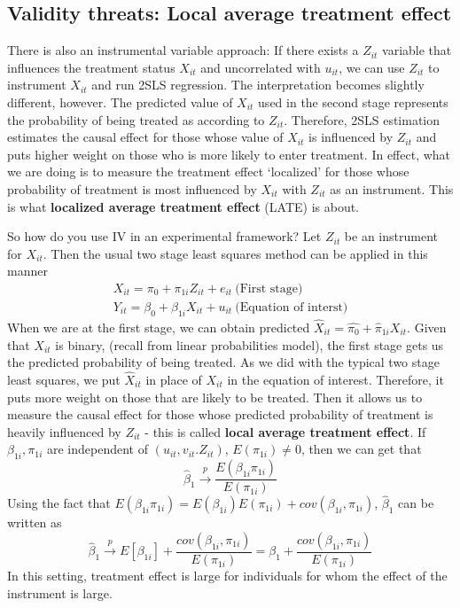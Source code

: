 \documentclass[12pt]{article}
\theoremstyle{definition}
\theoremstyle{property}
\theoremstyle{assumption}
\theoremstyle{example}
\theoremstyle{comment}
\begin{document}
\subsection{Validity threats: Local average treatment effect}
There is also an instrumental variable approach: If there exists a $Z_{it}$ variable that influences the treatment status $X_{it}$ and uncorrelated with $u_{it}$, we can use $Z_{it}$ to instrument $X_{it}$ and run 2SLS regression. The interpretation becomes slightly different, however. The predicted value of $X_{it}$ used in the second stage represents the probability of being treated as according to $Z_{it}$. Therefore, 2SLS estimation estimates the causal effect for those whose value of $X_{it}$ is influenced by $Z_{it}$ and puts higher weight on those who is more likely to enter treatment. In effect, what we are doing is to measure the treatment effect `localized' for those whose probability of treatment is most influenced by $X_{it}$ with $Z_{it}$ as an instrument. This is what \textbf{localized average treatment effect} (LATE) is about.
\par\medskip
So how do you use IV in an experimental framework? Let $Z_{it}$ be an instrument for $X_{it}$. Then the usual two stage least squares method can be applied in this manner
\begin{gather*}
X_{it} = \pi_0+\pi_{1i}Z_{it}+e_{it} \ \text{(First stage)}\\
Y_{it} = \beta_0+\beta_{1i}X_{it}+u_{it} \ \text{(Equation of interst)}
\end{gather*}
When we are at the first stage, we can obtain predicted $\hat{X}_{it}=\hat{\pi_0}+\hat{\pi}_{1i}X_{it}$. Given that $X_{it}$ is binary, (recall from linear probabilities model), the first stage gets us the predicted probability of being treated. As we did with the typical two stage least squares, we put $\hat{X}_{it}$ in place of $X_{it}$ in the equation of interest. Therefore, it puts more weight on those that are likely to be treated. Then it allows us to measure the causal effect for those whose predicted probability of treatment is heavily influenced by $Z_{it}$ - this is called \textbf{local average treatment effect}. If $\beta_{1i}, \pi_{1i}$ are independent of $(u_{it},v_{it}.Z_{it})$, $E(\pi_{1i})\neq0$, then we can get that
\[
\hat{\beta}_{1}\xrightarrow{p}\frac{E(\beta_{1i}\pi_{1i})}{E(\pi_{1i})}
\]
Using the fact that $E(\beta_{1i}\pi_{1i})=E(\beta_{1i})E(\pi_{1i})+cov(\beta_{1i},\pi_{1i})$, $\hat{\beta}_1$ can be written as 
\[
\hat{\beta}_{1}\xrightarrow{p} E[\beta_{1i}]+\frac{cov(\beta_{1i},\pi_{1i})}{E(\pi_{1i})} = \beta_1+\frac{cov(\beta_{1i},\pi_{1i})}{E(\pi_{1i})}
\]
In this setting, treatment effect is large for individuals for whom the effect of the instrument is large.
\par\medskip
\end{document}
